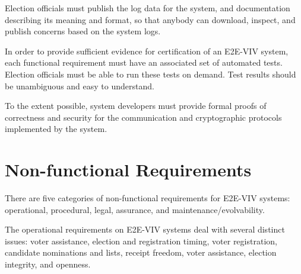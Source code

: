 Election officials must publish the log data for the system, and
documentation describing its meaning and format, so that anybody can
download, inspect, and publish concerns based on the system logs.


In order to provide sufficient evidence for certification of an
E2E-VIV system, each functional requirement must have an associated
set of automated tests. Election officials must be able to run these
tests on demand. Test results should be unambiguous and easy to
understand.

To the extent possible, system developers must provide formal proofs
of correctness and security for the communication and cryptographic
protocols implemented by the system.

\section{Non-functional Requirements}

There are five categories of non-functional requirements for E2E-VIV
systems: operational, procedural, legal, assurance, and
maintenance/evolvability.

\label{req:operational}

The operational requirements on E2E-VIV systems deal with several
distinct issues: voter assistance, election and registration timing,
voter registration, candidate nominations and lists, receipt freedom,
voter assistance, election integrity, and openness.


